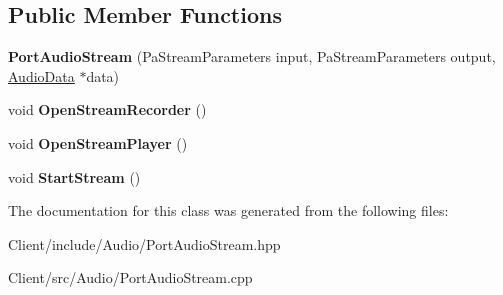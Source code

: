 \subsection*{Public Member Functions}
\begin{DoxyCompactItemize}
\item 
\mbox{\label{class_port_audio_stream_adca8e4d379d44412dea3e92143270e26}} 
{\bfseries Port\+Audio\+Stream} (Pa\+Stream\+Parameters input, Pa\+Stream\+Parameters output, \hyperlink{class_audio_data}{Audio\+Data} $\ast$data)
\item 
\mbox{\label{class_port_audio_stream_ab750710cae4d8e1c0f1bb771a73bedfe}} 
void {\bfseries Open\+Stream\+Recorder} ()
\item 
\mbox{\label{class_port_audio_stream_ab6e03287c72e34984d05510a61797e7a}} 
void {\bfseries Open\+Stream\+Player} ()
\item 
\mbox{\label{class_port_audio_stream_aa2fa5f227ea2770fe9ce56d01703097c}} 
void {\bfseries Start\+Stream} ()
\end{DoxyCompactItemize}


The documentation for this class was generated from the following files\+:\begin{DoxyCompactItemize}
\item 
Client/include/\+Audio/Port\+Audio\+Stream.\+hpp\item 
Client/src/\+Audio/Port\+Audio\+Stream.\+cpp\end{DoxyCompactItemize}
